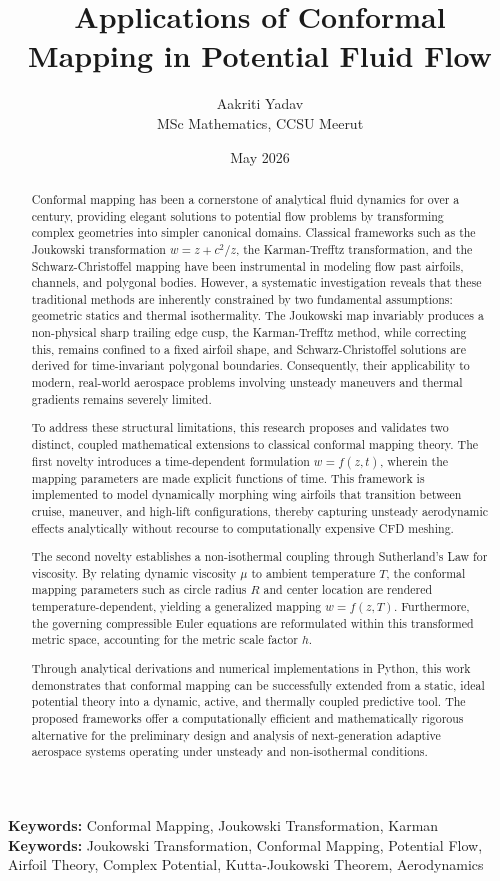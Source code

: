 \documentclass[12pt,a4paper]{article}
\title{Applications of Conformal Mapping in Potential Fluid Flow}
\author{Aakriti Yadav \\ MSc Mathematics, CCSU Meerut}
\date{May 2026}
\begin{document}
\maketitle
\begin{abstract}
Conformal mapping has been a cornerstone of analytical fluid dynamics for over a century, providing elegant solutions to potential flow problems by transforming complex geometries into simpler canonical domains. Classical frameworks such as the Joukowski transformation $w = z + c^2/z$, the Karman-Trefftz transformation, and the Schwarz-Christoffel mapping have been instrumental in modeling flow past airfoils, channels, and polygonal bodies. However, a systematic investigation reveals that these traditional methods are inherently constrained by two fundamental assumptions: geometric statics and thermal isothermality. The Joukowski map invariably produces a non-physical sharp trailing edge cusp, the Karman-Trefftz method, while correcting this, remains confined to a fixed airfoil shape, and Schwarz-Christoffel solutions are derived for time-invariant polygonal boundaries. Consequently, their applicability to modern, real-world aerospace problems involving unsteady maneuvers and thermal gradients remains severely limited.

To address these structural limitations, this research proposes and validates two distinct, coupled mathematical extensions to classical conformal mapping theory. The first novelty introduces a time-dependent formulation $w = f(z,t)$, wherein the mapping parameters are made explicit functions of time. This framework is implemented to model dynamically morphing wing airfoils that transition between cruise, maneuver, and high-lift configurations, thereby capturing unsteady aerodynamic effects analytically without recourse to computationally expensive CFD meshing. 

The second novelty establishes a non-isothermal coupling through Sutherland's Law for viscosity. By relating dynamic viscosity $\mu$ to ambient temperature $T$, the conformal mapping parameters such as circle radius $R$ and center location are rendered temperature-dependent, yielding a generalized mapping $w = f(z,T)$. Furthermore, the governing compressible Euler equations are reformulated within this transformed metric space, accounting for the metric scale factor $h$. 

Through analytical derivations and numerical implementations in Python, this work demonstrates that conformal mapping can be successfully extended from a static, ideal potential theory into a dynamic, active, and thermally coupled predictive tool. The proposed frameworks offer a computationally efficient and mathematically rigorous alternative for the preliminary design and analysis of next-generation adaptive aerospace systems operating under unsteady and non-isothermal conditions.

\end{abstract}
\vspace{0.3cm}
\noindent\textbf{Keywords:} Conformal Mapping, Joukowski Transformation, Karman
\vspace{0.3cm}
\noindent\textbf{Keywords:} Joukowski Transformation, Conformal Mapping, Potential Flow, Airfoil Theory, Complex Potential, Kutta-Joukowski Theorem, Aerodynamics
\tableofcontents
\end{document}
